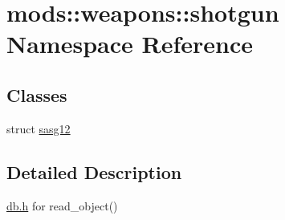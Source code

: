 \hypertarget{namespacemods_1_1weapons_1_1shotgun}{}\section{mods\+:\+:weapons\+:\+:shotgun Namespace Reference}
\label{namespacemods_1_1weapons_1_1shotgun}
\subsection*{Classes}
\begin{DoxyCompactItemize}
\item 
struct \hyperlink{structmods_1_1weapons_1_1shotgun_1_1sasg12}{sasg12}
\end{DoxyCompactItemize}


\subsection{Detailed Description}
\hyperlink{db_8h_source}{db.\+h} for read\+\_\+object() 